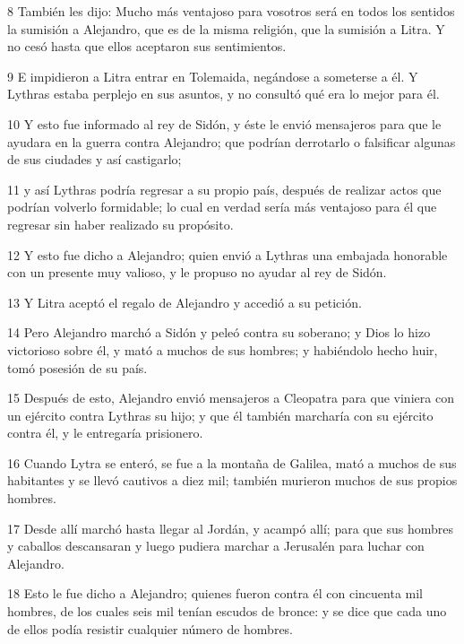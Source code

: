 \par 8 También les dijo: Mucho más ventajoso para vosotros será en todos los sentidos la sumisión a Alejandro, que es de la misma religión, que la sumisión a Litra. Y no cesó hasta que ellos aceptaron sus sentimientos.

\par 9 E impidieron a Litra entrar en Tolemaida, negándose a someterse a él. Y Lythras estaba perplejo en sus asuntos, y no consultó qué era lo mejor para él.

\par 10 Y esto fue informado al rey de Sidón, y éste le envió mensajeros para que le ayudara en la guerra contra Alejandro; que podrían derrotarlo o falsificar algunas de sus ciudades y así castigarlo;

\par 11 y así Lythras podría regresar a su propio país, después de realizar actos que podrían volverlo formidable; lo cual en verdad sería más ventajoso para él que regresar sin haber realizado su propósito.

\par 12 Y esto fue dicho a Alejandro; quien envió a Lythras una embajada honorable con un presente muy valioso, y le propuso no ayudar al rey de Sidón.

\par 13 Y Litra aceptó el regalo de Alejandro y accedió a su petición.

\par 14 Pero Alejandro marchó a Sidón y peleó contra su soberano; y Dios lo hizo victorioso sobre él, y mató a muchos de sus hombres; y habiéndolo hecho huir, tomó posesión de su país.

\par 15 Después de esto, Alejandro envió mensajeros a Cleopatra para que viniera con un ejército contra Lythras su hijo; y que él también marcharía con su ejército contra él, y le entregaría prisionero.

\par 16 Cuando Lytra se enteró, se fue a la montaña de Galilea, mató a muchos de sus habitantes y se llevó cautivos a diez mil; también murieron muchos de sus propios hombres.

\par 17 Desde allí marchó hasta llegar al Jordán, y acampó allí; para que sus hombres y caballos descansaran y luego pudiera marchar a Jerusalén para luchar con Alejandro.

\par 18 Esto le fue dicho a Alejandro; quienes fueron contra él con cincuenta mil hombres, de los cuales seis mil tenían escudos de bronce: y se dice que cada uno de ellos podía resistir cualquier número de hombres.

